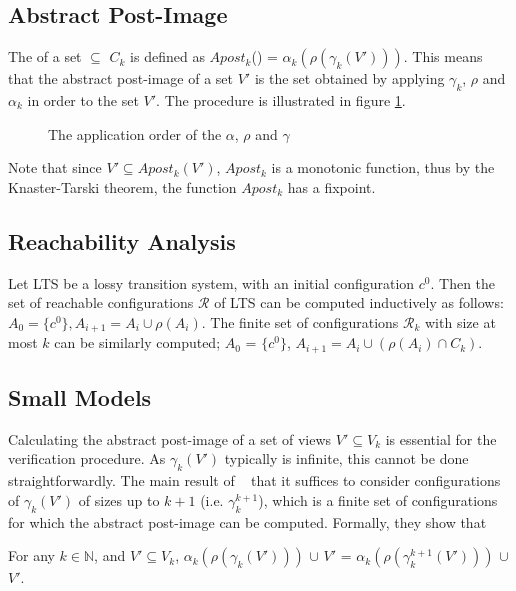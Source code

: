 \subsection{Abstract Post-Image}
The  of a set  $\subseteq$ $C_k$ is defined as $Apost_k$() = $\alpha_k(\rho(\gamma_k(V')))$. This means that the abstract post-image of a set $V'$ is the set obtained by applying $\gamma_k$, $\rho$ and $\alpha_k$ in order to the set $V'$. The procedure is illustrated in figure \ref{apost}.
\begin{figure}
\abstraction
\caption{The application order of the $\alpha$, $\rho$ and $\gamma$}
\label{apost}
\end{figure}

Note that since $V' \subseteq Apost_k(V')$, $Apost_k$ is a monotonic function, thus by the Knaster-Tarski theorem, the function $Apost_k$ has a fixpoint.

\subsection{Reachability Analysis}
\label{reachcompute}
Let LTS be a lossy transition system, with an initial configuration $c^0$. Then the set of reachable configurations $\mathcal{R}$ of LTS can be computed inductively as follows: $A_0 = \{c^0\}, A_{i+1}= A_i \cup \rho(A_i)$. The finite set of configurations $\mathcal{R}_k$ with size at most $k$ can be similarly computed; $A_0$ = $\{c^0\}$, $A_{i+1} = A_i \cup (\rho(A_i) \cap C_k)$.

\subsection{Small Models}
\label{proof}
Calculating the abstract post-image of a set of views $V' \subseteq V_k$ is essential for the verification procedure. As $\gamma_k(V')$ typically is infinite, this cannot be done straightforwardly. The main result of ~\cite{parosh} that it suffices to consider configurations of $\gamma_k(V')$ of sizes up to $k+1$ (i.e. $\gamma_k^{k+1}$), which is a finite set of configurations for which the abstract post-image can be computed. Formally, they show that

\begin{lemma}
\label{lemma1}
For any $k\in\mathbb{N}$, and $V'\subseteq V_k$, $\alpha_k(\rho(\gamma_k(V')))$ $\cup$ $V'$ = $\alpha_k(\rho(\gamma_k^{k+1}(V')))$ $\cup$ $V'$.
\end{lemma}

